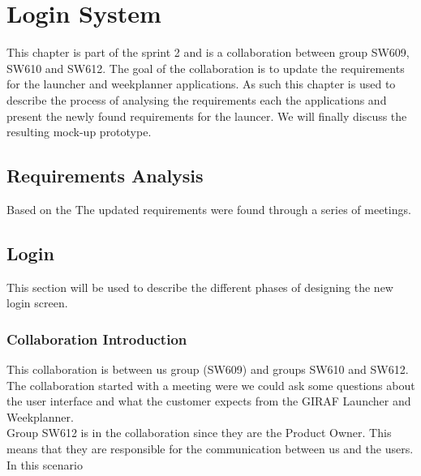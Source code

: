 \chapter{Login System}\label{sec:LoginColab}
This chapter is part of the sprint 2 and is a collaboration between group
SW609, SW610 and SW612. The goal of the collaboration is to update the
requirements for the launcher and weekplanner applications. As such this
chapter is used to describe the process of analysing the requirements each the
applications and present the newly found requirements for the launcer. We will
finally discuss the resulting mock-up prototype. 

\section{Requirements Analysis}

Based on the 
The updated requirements were found through a series of meetings. 

\section{Login}\label{sec:LoginColab}
This section will be used to describe the different phases of designing the new
login screen.

\subsection{Collaboration Introduction}
This collaboration is between us group (SW609) and groups SW610 and SW612. The
collaboration started with a meeting were we could ask some questions about the
user interface and what the customer expects from the GIRAF Launcher and
Weekplanner. \\
Group SW612 is in the collaboration since they are the Product Owner. This means
that they are responsible for the communication between us and the users. In
this scenario 

